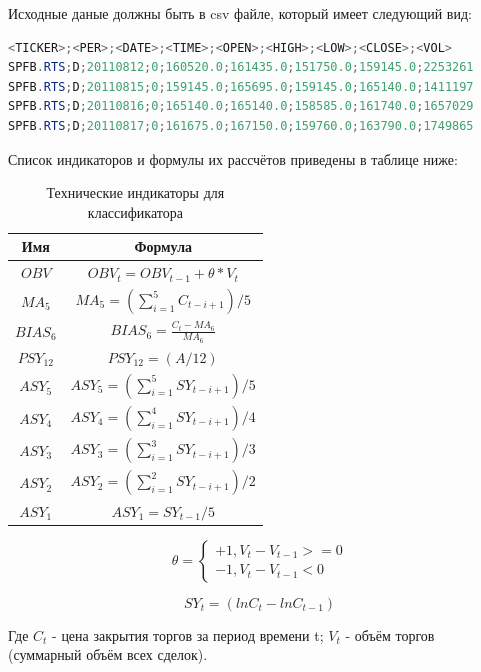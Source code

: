 \documentclass[a4paper,12pt]{article}
\begin{document}
Исходные даные должны быть в csv файле, который имеет следующий вид:
\begin{lstlisting}[language=Java, caption=формат исходного файла, label=listing:CSV]
<TICKER>;<PER>;<DATE>;<TIME>;<OPEN>;<HIGH>;<LOW>;<CLOSE>;<VOL>
SPFB.RTS;D;20110812;0;160520.0;161435.0;151750.0;159145.0;2253261
SPFB.RTS;D;20110815;0;159145.0;165695.0;159145.0;165140.0;1411197
SPFB.RTS;D;20110816;0;165140.0;165140.0;158585.0;161740.0;1657029
SPFB.RTS;D;20110817;0;161675.0;167150.0;159760.0;163790.0;1749865
\end{lstlisting}

Список индикаторов и формулы их рассчётов приведены в таблице ниже:
\begin{table}[h]
	\caption{Технические индикаторы для классификатора}
	\centering
	\begin{tabular}{|c|c|}
	\hline
	Имя & Формула \\
	\hline
	$OBV$ & $OBV_t = OBV_{t-1} + \theta * V_t$ \\
	\hline
	$MA_5$ & $MA_5 = (\sum\limits_{i=1}^5 C_{t-i+1}) / 5$ \\
	\hline
	$ BIAS_6 $ & $ BIAS_6 = \frac {C_t - MA_6} {MA_6} $ \\
	\hline
	$ PSY_{12} $ & $ PSY_{12} = (A/12)$ \\
	\hline
	$ ASY_5 $ & $ ASY_5 = (\sum\limits_{i=1}^{5} SY_{t-i+1}) / 5$ \\
	\hline
	$ ASY_4 $ & $ ASY_4 = (\sum\limits_{i=1}^{4} SY_{t-i+1}) / 4$ \\
	\hline
	$ ASY_3 $ & $ ASY_3 = (\sum\limits_{i=1}^{3} SY_{t-i+1}) / 3$ \\
	\hline
	$ ASY_2 $ & $ ASY_2 = (\sum\limits_{i=1}^{2} SY_{t-i+1}) / 2$ \\
	\hline
	$ ASY_1 $ & $ ASY_1 = SY_{t-1} / 5$ \\
	\hline
	\end{tabular} 
\label{table:indicators} 
\end{table}

\begin{equation*}
\theta = \begin{cases}
      		+1, V_t - V_{t-1} >= 0 \\
      		-1, V_t - V_{t-1} < 0
	      \end{cases}
\end{equation*}			


$$ SY_t = (ln C_t - ln C_{t-1}) $$

Где $C_t$ - цена закрытия торгов за период времени t;
$V_t $ - объём торгов (суммарный объём всех сделок).
\end{document}
